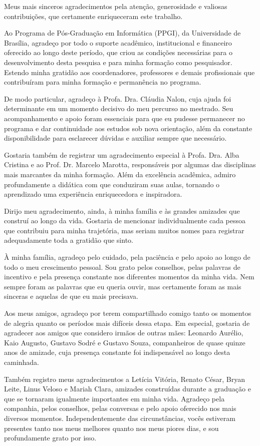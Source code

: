 Meus mais sinceros agradecimentos pela atenção, generosidade e valiosas contribuições, que certamente enriqueceram este trabalho.

Ao Programa de Pós-Graduação em Informática (PPGI), da Universidade de Brasília, agradeço por todo o suporte acadêmico, institucional e financeiro oferecido ao longo deste período, que criou as condições necessárias para o desenvolvimento desta pesquisa e para minha formação como pesquisador. Estendo minha gratidão aos coordenadores, professores e demais profissionais que contribuíram para minha formação e permanência no programa.

De modo particular, agradeço à Profa. Dra. Cláudia Nalon, cuja ajuda foi determinante em um momento decisivo do meu percurso no mestrado. Seu acompanhamento e apoio foram essenciais para que eu pudesse permanecer no programa e dar continuidade aos estudos sob nova orientação, além da constante disponibilidade para esclarecer dúvidas e auxiliar sempre que necessário.

Gostaria também de registrar um agradecimento especial à Profa. Dra. Alba Cristina e ao Prof. Dr. Marcelo Marotta, responsáveis por algumas das disciplinas mais marcantes da minha formação. Além da excelência acadêmica, admiro profundamente a didática com que conduziram suas aulas, tornando o aprendizado uma experiência enriquecedora e inspiradora.

Dirijo meu agradecimento, ainda, à minha família e às grandes amizades que construí ao longo da vida. Gostaria de mencionar individualmente cada pessoa que contribuiu para minha trajetória, mas seriam muitos nomes para registrar adequadamente toda a gratidão que sinto.

À minha família, agradeço pelo cuidado, pela paciência e pelo apoio ao longo de todo o meu crescimento pessoal. Sou grato pelos conselhos, pelas palavras de incentivo e pela presença constante nos diferentes momentos da minha vida. Nem sempre foram as palavras que eu queria ouvir, mas certamente foram as mais sinceras e aquelas de que eu mais precisava.

Aos meus amigos, agradeço por terem compartilhado comigo tanto os momentos de alegria quanto os períodos mais difíceis dessa etapa. Em especial, gostaria de agradecer aos amigos que considero irmãos de outras mães: Leonardo Aurélio, Kaio Augusto, Gustavo Sodré e Gustavo Souza, companheiros de quase quinze anos de amizade, cuja presença constante foi indispensável ao longo desta caminhada.

Também registro meus agradecimentos a Letícia Vitória, Renato César, Bryan Leite, Linus Veloso e Mariah Clara, amizades construídas durante a graduação e que se tornaram igualmente importantes em minha vida. Agradeço pela companhia, pelos conselhos, pelas conversas e pelo apoio oferecido nos mais diversos momentos. Independentemente das circunstâncias, vocês estiveram presentes tanto nos meus melhores quanto nos meus piores dias, e sou profundamente grato por isso.

